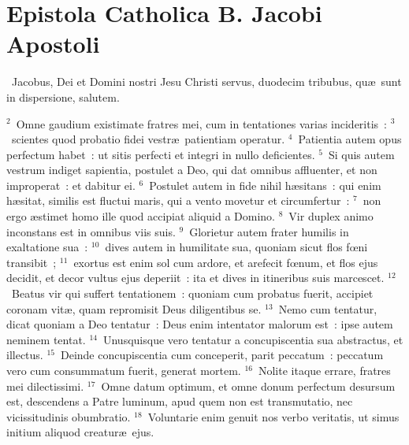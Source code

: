{\centering \section*{Epistola Catholica B. Jacobi Apostoli}}\thispagestyle{empty}

~\lettrine[lines=10,image=true,loversize=0.05,lraise=-0.03]{J}{}acobus, Dei et Domini nostri Jesu Christi servus, duodecim tribubus, qu\ae\ sunt in dispersione, salutem.


${}^{2}$~Omne gaudium existimate fratres mei, cum in tentationes varias incideritis~:
${}^{3}$~scientes quod probatio fidei vestr\ae\ patientiam operatur.
${}^{4}$~Patientia autem opus perfectum habet~: ut sitis perfecti et integri in nullo deficientes.
${}^{5}$~Si quis autem vestrum indiget sapientia, postulet a Deo, qui dat omnibus affluenter, et non improperat~: et dabitur ei.
${}^{6}$~Postulet autem in fide nihil h\ae sitans~: qui enim h\ae sitat, similis est fluctui maris, qui a vento movetur et circumfertur~:
${}^{7}$~non ergo \ae stimet homo ille quod accipiat aliquid a Domino.
${}^{8}$~Vir duplex animo inconstans est in omnibus viis suis.
${}^{9}$~Glorietur autem frater humilis in exaltatione sua~:
${}^{10}$~dives autem in humilitate sua, quoniam sicut flos fœni transibit~;
${}^{11}$~exortus est enim sol cum ardore, et arefecit fœnum, et flos ejus decidit, et decor vultus ejus deperiit~: ita et dives in itineribus suis marcescet.
${}^{12}$~Beatus vir qui suffert tentationem~: quoniam cum probatus fuerit, accipiet coronam vit\ae , quam repromisit Deus diligentibus se.
${}^{13}$~Nemo cum tentatur, dicat quoniam a Deo tentatur~: Deus enim intentator malorum est~: ipse autem neminem tentat.
${}^{14}$~Unusquisque vero tentatur a concupiscentia sua abstractus, et illectus.
${}^{15}$~Deinde concupiscentia cum conceperit, parit peccatum~: peccatum vero cum consummatum fuerit, generat mortem.
${}^{16}$~Nolite itaque errare, fratres mei dilectissimi.
${}^{17}$~Omne datum optimum, et omne donum perfectum desursum est, descendens a Patre luminum, apud quem non est transmutatio, nec vicissitudinis obumbratio.
${}^{18}$~Voluntarie enim genuit nos verbo veritatis, ut simus initium aliquod creatur\ae\ ejus.


